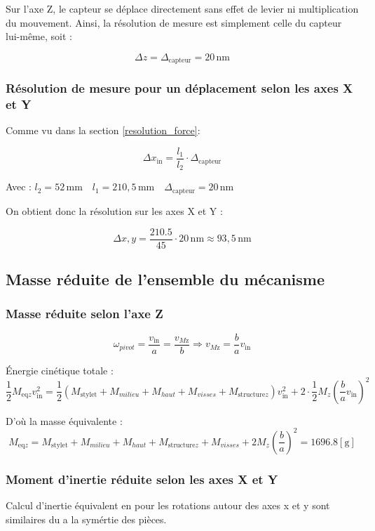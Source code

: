 \documentclass[a4paper, 11pt]{article} %
\begin{document}
Sur l’axe Z, le capteur se déplace directement sans effet de levier ni multiplication du mouvement. Ainsi, la résolution de mesure est simplement celle du capteur lui-même, soit :

\[
\Delta z = \Delta_{\text{capteur}} = 20 \, \text{nm}
\]

\subsubsection*{Résolution de mesure pour un déplacement selon les axes X et Y}

Comme vu dans la section \ref{resolution_force}:

\[
\Delta x_{\text{in}} = \frac{l_1}{l_2} \cdot \Delta_{\text{capteur}}
\]

Avec : $  l_2 = 52 \, \text{mm}\quad l_1 = 210,5 \, \text{mm}\quad \Delta_{\text{capteur}} = 20 \, \text{nm} $

On obtient donc la résolution sur les axes X et Y :

\[
\Delta {x,y} = \frac{210.5}{45} \cdot 20 \, \text{nm} \approx 93,5 \, \text{nm}
\]

\subsection{Masse réduite de l’ensemble du mécanisme}
\subsubsection*{Masse réduite selon l'axe Z}



\[
\omega_{pivot} = \frac{v_{\text{in}}}{a} = \frac{v_{M\text{z}}}{b}
\Rightarrow v_{M\text{z}} = \frac{b}{a} v_{\text{in}}
\]

Énergie cinétique totale :
\[
\frac{1}{2} M_{\text{eq}z} v_{\text{in}}^2 = 
\frac{1}{2} (M_{\text{stylet}} + M_{milieu} + M_{haut} + M_{visses}+ M_{\text{structure}z}) v_{\text{in}}^2 
+ 2 \cdot \frac{1}{2} M_z \left( \frac{b}{a} v_{\text{in}} \right)^2
\]

D’où la masse équivalente :
\[
M_{\text{eq}z} = M_{\text{stylet}} + M_{milieu} + M_{haut}+ M_{\text{structure}z} + M_{visses} + 2 M_z \left( \frac{b}{a} \right)^2 = 1696.8  [\text{g}]
\]

\subsubsection*{Moment d'inertie réduite selon les axes X et Y}
Calcul d'inertie équivalent en pour les rotations autour des axes x et y sont similaires du a la symértie des pièces.
\end{document}
